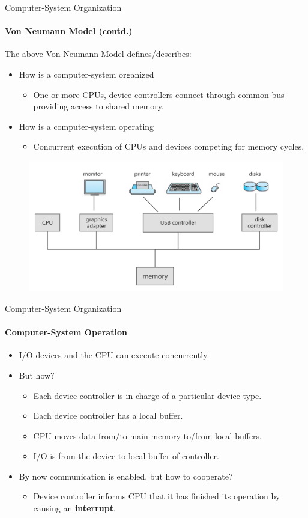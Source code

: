 \documentclass[10pt]{beamer}
\begin{document}
\begin{frame}{Computer-System Organization}
\framesubtitle{Von Neumann Model (contd.)}
\small
The above Von Neumann Model defines/describes:
\begin{itemize}
\small
\item How is a computer-system organized
\begin{itemize}
\item One or more CPUs, device controllers connect through common bus providing access to shared memory.
\end{itemize}
\item How is a computer-system operating
\begin{itemize}
\item Concurrent execution of CPUs and devices competing for memory cycles.
\end{itemize}
\end{itemize}
\begin{figure}
\includegraphics[width=.6\linewidth]{resources/1-14computer_system_organization.jpg} 
\end{figure}
\end{frame}

\begin{frame}{Computer-System Organization}
\framesubtitle{Computer-System Operation}
\begin{itemize}
\item I/O devices and the CPU can execute \alert{concurrently}.
\item But how?
\begin{itemize}
\item Each device controller is in charge of a particular device type.
\item Each device controller has a local buffer.
\item CPU moves data from/to main memory to/from local buffers.
\item I/O is from the device to local buffer of controller.
\end{itemize}
\item By now communication is enabled, but how to cooperate?
\begin{itemize}
\item Device controller informs CPU that it has finished its operation by causing an \textbf{\alert{interrupt}}.
\end{itemize}
\end{itemize}
\end{frame}
\end{document}
